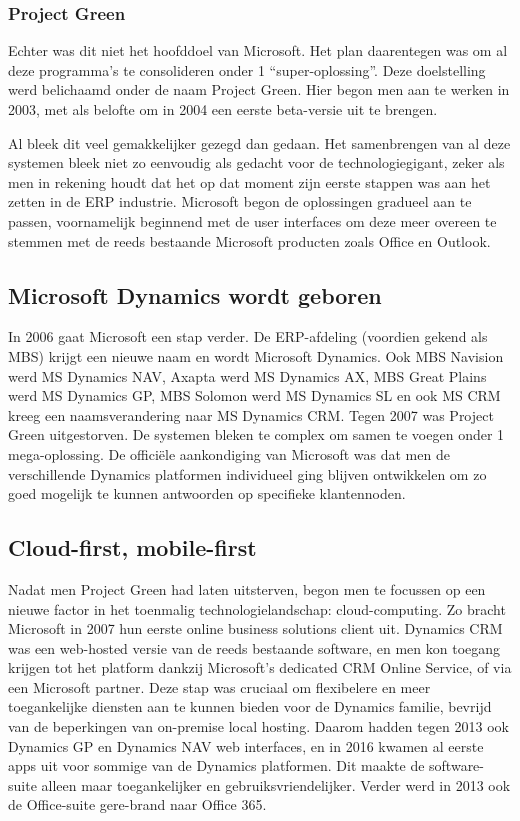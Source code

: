 \subsubsection{Project Green }
Echter was dit niet het hoofddoel van Microsoft. Het plan daarentegen was om al deze programma’s te consolideren onder 1 “super-oplossing”. Deze doelstelling werd belichaamd onder de naam Project Green. Hier begon men aan te werken in 2003, met als belofte om in 2004 een eerste beta-versie uit te brengen. 

Al bleek dit veel gemakkelijker gezegd dan gedaan. Het samenbrengen van al deze systemen bleek niet zo eenvoudig als gedacht voor de technologiegigant, zeker als men in rekening houdt dat het op dat moment zijn eerste stappen was aan het zetten in de ERP industrie. Microsoft begon de oplossingen gradueel aan te passen, voornamelijk beginnend met de user interfaces om deze meer overeen te stemmen met de reeds bestaande Microsoft producten zoals Office en Outlook. 


\subsection{Microsoft Dynamics wordt geboren}
In 2006 gaat Microsoft een stap verder. De ERP-afdeling (voordien gekend als MBS) krijgt een nieuwe naam en wordt Microsoft Dynamics. Ook MBS Navision werd MS Dynamics NAV, Axapta werd MS Dynamics AX, MBS Great Plains werd MS Dynamics GP, MBS Solomon werd MS Dynamics SL en ook MS CRM kreeg een naamsverandering naar MS Dynamics CRM. 
Tegen 2007 was Project Green uitgestorven. De systemen bleken te complex om samen te voegen onder 1 mega-oplossing. De officiële aankondiging van Microsoft was dat men de verschillende Dynamics platformen individueel ging blijven ontwikkelen om zo goed mogelijk te kunnen antwoorden op specifieke klantennoden. 


\subsection{Cloud-first, mobile-first}
Nadat men Project Green had laten uitsterven, begon men te focussen op een nieuwe factor in het toenmalig technologielandschap: cloud-computing.  
Zo bracht Microsoft in 2007 hun eerste online business solutions client uit. Dynamics CRM was een web-hosted versie van de reeds bestaande software, en men kon toegang krijgen tot het platform dankzij Microsoft’s dedicated CRM Online Service, of via een Microsoft partner. Deze stap was cruciaal om flexibelere en meer toegankelijke diensten aan te kunnen bieden voor de Dynamics familie, bevrijd van de beperkingen van on-premise local hosting. 
Daarom hadden tegen 2013 ook Dynamics GP en Dynamics NAV web interfaces, en in 2016 kwamen al eerste apps uit voor sommige van de Dynamics platformen. Dit maakte de software-suite alleen maar toegankelijker en gebruiksvriendelijker. Verder werd in 2013 ook de Office-suite gere-brand naar Office 365.  


